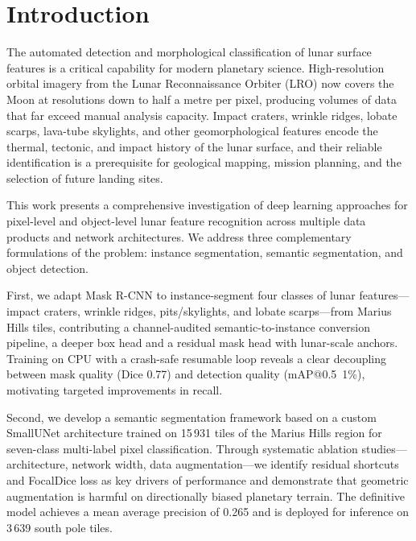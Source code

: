 \documentclass{aa}
\begin{document}


   \maketitle
%

\section{Introduction}

The automated detection and morphological classification of lunar surface features is a critical capability for modern planetary science. High-resolution orbital imagery from the Lunar Reconnaissance Orbiter (LRO) now covers the Moon at resolutions down to half a metre per pixel, producing volumes of data that far exceed manual analysis capacity. Impact craters, wrinkle ridges, lobate scarps, lava-tube skylights, and other geomorphological features encode the thermal, tectonic, and impact history of the lunar surface, and their reliable identification is a prerequisite for geological mapping, mission planning, and the selection of future landing sites.

This work presents a comprehensive investigation of deep learning approaches for pixel-level and object-level lunar feature recognition across multiple data products and network architectures. We address three complementary formulations of the problem: instance segmentation, semantic segmentation, and object detection.

First, we adapt Mask R-CNN to instance-segment four classes of lunar features---impact craters, wrinkle ridges, pits/skylights, and lobate scarps---from Marius Hills tiles, contributing a channel-audited semantic-to-instance conversion pipeline, a deeper box head and a residual mask head with lunar-scale anchors. Training on CPU with a crash-safe resumable loop reveals a clear decoupling between mask quality (Dice 0.77) and detection quality (mAP@0.5~1\%), motivating targeted improvements in recall.

Second, we develop a semantic segmentation framework based on a custom SmallUNet architecture trained on 15\,931 tiles of the Marius Hills region for seven-class multi-label pixel classification. Through systematic ablation studies---architecture, network width, data augmentation---we identify residual shortcuts and FocalDice loss as key drivers of performance and demonstrate that geometric augmentation is harmful on directionally biased planetary terrain. The definitive model achieves a mean average precision of 0.265 and is deployed for inference on 3\,639 south pole tiles.
\end{document}
